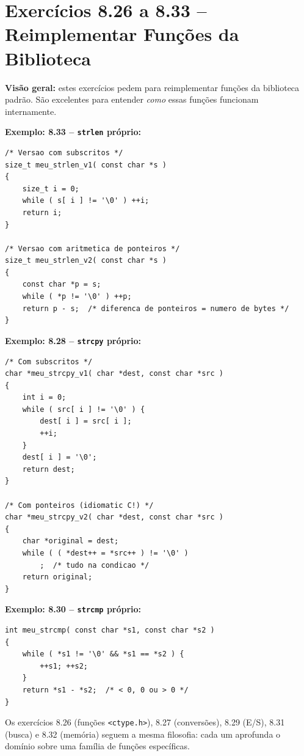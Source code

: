 \documentclass[12pt,a4paper]{article}
\begin{document}
\section{Exercícios 8.26 a 8.33 -- Reimplementar Funções da Biblioteca}

\begin{respostabox}
\textbf{Visão geral:} estes exercícios pedem para reimplementar funções da biblioteca
padrão. São excelentes para entender \textit{como} essas funções funcionam internamente.

\textbf{Exemplo: 8.33 -- \texttt{strlen} próprio:}

\begin{lstlisting}
/* Versao com subscritos */
size_t meu_strlen_v1( const char *s )
{
    size_t i = 0;
    while ( s[ i ] != '\0' ) ++i;
    return i;
}

/* Versao com aritmetica de ponteiros */
size_t meu_strlen_v2( const char *s )
{
    const char *p = s;
    while ( *p != '\0' ) ++p;
    return p - s;  /* diferenca de ponteiros = numero de bytes */
}
\end{lstlisting}

\textbf{Exemplo: 8.28 -- \texttt{strcpy} próprio:}
\begin{lstlisting}
/* Com subscritos */
char *meu_strcpy_v1( char *dest, const char *src )
{
    int i = 0;
    while ( src[ i ] != '\0' ) {
        dest[ i ] = src[ i ];
        ++i;
    }
    dest[ i ] = '\0';
    return dest;
}

/* Com ponteiros (idiomatic C!) */
char *meu_strcpy_v2( char *dest, const char *src )
{
    char *original = dest;
    while ( ( *dest++ = *src++ ) != '\0' )
        ;  /* tudo na condicao */
    return original;
}
\end{lstlisting}

\textbf{Exemplo: 8.30 -- \texttt{strcmp} próprio:}
\begin{lstlisting}
int meu_strcmp( const char *s1, const char *s2 )
{
    while ( *s1 != '\0' && *s1 == *s2 ) {
        ++s1; ++s2;
    }
    return *s1 - *s2;  /* < 0, 0 ou > 0 */
}
\end{lstlisting}

Os exercícios 8.26 (funções \texttt{<ctype.h>}), 8.27 (conversões), 8.29 (E/S),
8.31 (busca) e 8.32 (memória) seguem a mesma filosofia: cada um aprofunda o
domínio sobre uma família de funções específicas.
\end{respostabox}
\end{document}
